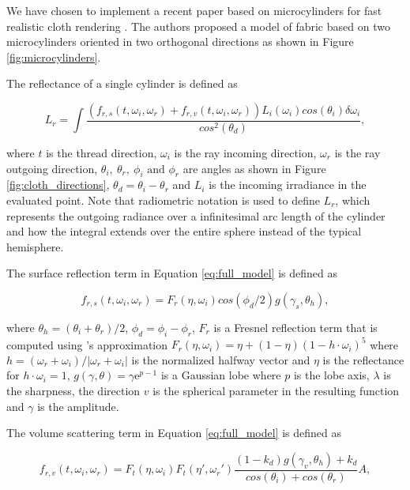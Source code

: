 \documentclass[12pt]{article}
\begin{document}
We have chosen to implement a recent paper based on microcylinders for fast realistic cloth rendering \cite{Sadeghi2013}.
The authors proposed a model of fabric based on two microcylinders oriented in two orthogonal directions as shown in Figure \ref{fig:microcylinders}.

The reflectance of a single cylinder is defined as

\begin{equation}
L_r = \int \frac{\left(f_{r,s}(t, \omega_i, \omega_r) + f_{r,v}(t,\omega_i,\omega_r)\right)L_i(\omega_i)cos(\theta_i)\delta \omega_i}{cos^2(\theta_d)},
\label{eq:full_model}
\end{equation}

where $t$ is the thread direction, $\omega_i$ is the ray incoming direction, $\omega_r$ is the ray outgoing direction, $\theta_i, ~\theta_r, ~ \phi_i \mbox{ and } \phi_r$ are angles as shown in Figure \ref{fig:cloth_directions},  $\theta_d = \theta_i-\theta_r$ and $L_i$ is the incoming irradiance in the evaluated point.
Note that radiometric notation \cite{Marschner2003} is used to define $L_r$, which represents the outgoing radiance over a infinitesimal arc length of the cylinder and how the integral extends over the entire sphere instead of the typical hemisphere.

The surface reflection term in Equation \ref{eq:full_model} is defined as

\begin{equation}
f_{r,s}(t, \omega_i, \omega_r) = F_r(\eta, \omega_i) cos(\phi_d/2)g(\gamma_s, \theta_h),
\end{equation}

where $\theta_h = (\theta_i+\theta_r)/2$, $\phi_d = \phi_i-\phi_r$, $F_r$ is a Fresnel reflection term that is computed using \citeauthor{Schlick1994}'s approximation \cite{Schlick1994} $F_r(\eta, \omega_i) = \eta + (1 - \eta)(1 - h \cdot \omega_i)^5$ where $h = (\omega_r + \omega_i)/ \left|\omega_r + \omega_i \right|$ is the normalized halfway vector and $\eta$ is the reflectance for $h \cdot \omega_i = 1$, $g(\gamma, \theta) = \gamma \mathrm{e} ^{p-1}$ is a Gaussian lobe \cite{Wang2008} where $p$ is the lobe axis, $\lambda$ is the sharpness, the direction $v$ is the spherical parameter in the resulting function and $\gamma$ is the amplitude.

The volume scattering term in Equation \ref{eq:full_model} is defined as

\begin{equation}
f_{r,v}(t,\omega_i,\omega_r) = F_t(\eta, \omega_i) F_t(\eta', \omega_r') \frac{(1-k_d)g(\gamma_v, \theta_h)+k_d}{cos(\theta_i) + cos(\theta_r)} A,
\end{equation}
\end{document}
